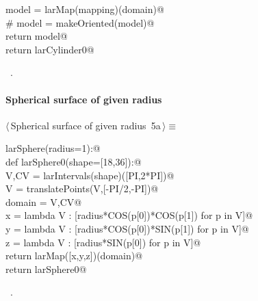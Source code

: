 \documentclass[11pt,oneside]{article}	%
\begin{document}
\begin{flushleft}
\begin{list}{}{}
\mbox{}\verb@      model = larMap(mapping)(domain)@\\
\mbox{}\verb@      # model = makeOriented(model)@\\
\mbox{}\verb@      return model@\\
\mbox{}\verb@   return larCylinder0@\\
\mbox{}\verb@@{\NWsep}
\end{list}
\vspace{-1ex}
\footnotesize\addtolength{\baselineskip}{-1ex}
\begin{list}{}{\setlength{\itemsep}{-\parsep}\setlength{\itemindent}{-\leftmargin}}
\item \NWtxtMacroRefIn\ .
\end{list}
\end{flushleft}
\paragraph{Spherical surface of given radius}
\begin{flushleft} \small \label{scrap9}
\protect{}$\langle\,$Spherical surface of given radius\nobreak\ {\footnotesize 5a}$\,\rangle\equiv$
\vspace{-1ex}
\begin{list}{}{} \item
\mbox{}\verb@def larSphere(radius=1):@\\
\mbox{}\verb@   def larSphere0(shape=[18,36]):@\\
\mbox{}\verb@      V,CV = larIntervals(shape)([PI,2*PI])@\\
\mbox{}\verb@      V = translatePoints(V,[-PI/2,-PI])@\\
\mbox{}\verb@      domain = V,CV@\\
\mbox{}\verb@      x = lambda V : [radius*COS(p[0])*COS(p[1]) for p in V]@\\
\mbox{}\verb@      y = lambda V : [radius*COS(p[0])*SIN(p[1]) for p in V]@\\
\mbox{}\verb@      z = lambda V : [radius*SIN(p[0]) for p in V]@\\
\mbox{}\verb@      return larMap([x,y,z])(domain)@\\
\mbox{}\verb@   return larSphere0@\\
\mbox{}\verb@@{\NWsep}
\end{list}
\vspace{-1ex}
\footnotesize\addtolength{\baselineskip}{-1ex}
\begin{list}{}{\setlength{\itemsep}{-\parsep}\setlength{\itemindent}{-\leftmargin}}
\item \NWtxtMacroRefIn\ .
\end{list}
\end{flushleft}
\end{document}
